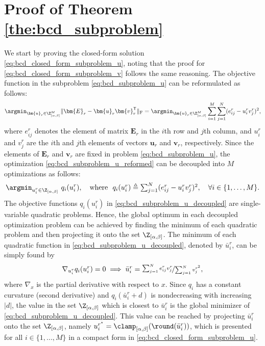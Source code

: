 \section{Proof of Theorem \ref{the:bcd_subproblem}} \label{app:monotonicity_proof}

We start by proving the closed-form solution \eqref{eq:bcd_closed_form_subproblem_u}, noting that the proof for \eqref{eq:bcd_closed_form_subproblem_v} follows the same reasoning.
The objective function in the subproblem \eqref{eq:bcd_subproblem_u} can be reformulated as follows:
\begin{align}
    \argmin_{\bm{u}_r \in \Z_{[\alpha,\beta]}^M} \|\bm{E}_r - \bm{u}_r \bm{v}_r^\mathsf{T}\|_{\rm F}
    = \argmin_{\bm{u}_r \in \Z_{[\alpha,\beta]}^M}\sum_{i=1}^M \sum_{j=1}^N (e_{ij}^r - u_i^r v_j^r)^2,
    \label{eq:bcd_subproblem_u_reformed}
\end{align}
where $e_{ij}^r$ denotes the element of matrix $\bm{E}_r$ in the $i$th row and $j$th column, and $u_i^r$ and $v_j^r$ are the $i$th and $j$th elements of vectors $\bm{u}_r$ and $\bm{v}_r$, respectively. Since the elements of $\bm{E}_r$ and $\bm{v}_r$ are fixed in problem \eqref{eq:bcd_subproblem_u}, the optimization \eqref{eq:bcd_subproblem_u_reformed} can be decoupled into $M$ optimizations as follows:
\begin{align}
    \argmin_{u^r_i \in \Z_{[\alpha,\beta]}} ~q_i(u_i^r), \quad
    \textstyle \text{where} ~~              q_i(u_i^r) \triangleq \sum_{j=1}^N (e_{ij}^r - u_i^r v_j^r)^2, \quad \forall i\in\{1,\dots,M\}.
    \label{eq:bcd_subproblem_u_decoupled}
\end{align}
The objective functions $q_i(u_i^r)$ in \eqref{eq:bcd_subproblem_u_decoupled} are single-variable quadratic problems. Hence, the global optimum in each decoupled optimization problem can be achieved by finding the minimum of each quadratic problem and then projecting it onto the set $\Z_{[\alpha,\beta]}$. The minimum of each quadratic function in \eqref{eq:bcd_subproblem_u_decoupled}, denoted by $\bar{u}_i^r$, can be simply found by
\begin{align}
    \textstyle \nabla_{u_i^r} q_i(u_i^r) = 0 \implies \bar{u}_i^r = \nicefrac{\sum_{j=1}^N e_{ij}^r v_j^r}{\sum_{j=1}^N v_j^{r^2}},
    \label{eq:bcd_subproblem_u_minimum}
\end{align}
where $\nabla_x$ is the partial derivative with respect to $x$.
Since $q_i$ has a constant curvature (second derivative) and $q_i(\bar{u}_i^r + d)$ is nondecreasing with increasing $|d|$, the value in the set $\Z_{[\alpha,\beta]}$ which is closest to $\bar{u}_i^r$ is the global minimizer of \eqref{eq:bcd_subproblem_u_decoupled}. This value can be reached by projecting $\bar{u}_i^r$ onto the set $\Z_{[\alpha,\beta]}$, namely $u^{r^\star}_i = \clamp_{[\alpha,\beta]}(\round(\bar{u}_i^r))$, which is presented for all $i\in\{1,...,M\}$ in a compact form in \eqref{eq:bcd_closed_form_subproblem_u}.

